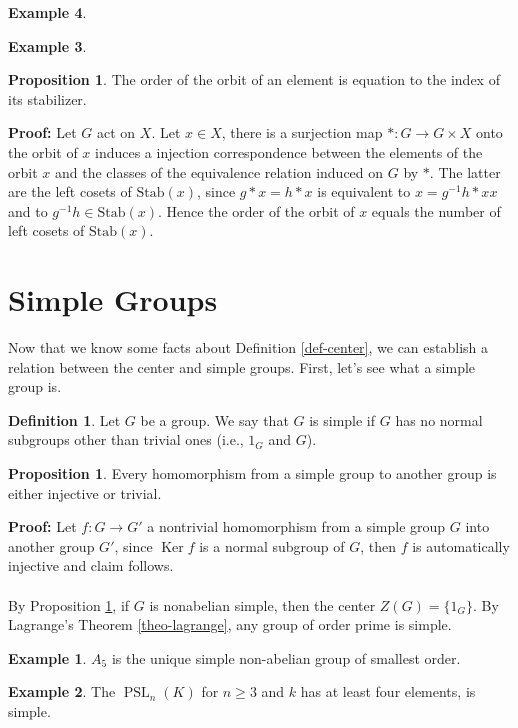 \documentclass[11pt]{amsbook}%
\theoremstyle{plain}
\theoremstyle{definition}
\newtheorem{definition*}{Definition}
\newtheorem*{example*}{Example}
\newtheorem{proposition}[theorem]{Proposition}
\numberwithin{equation}{section}
\renewcommand{\proof}{ \textbf{Proof: }}
\newcommand{\Stab}[1]{\text{Stab}(#1)}
\DeclareMathOperator{\PSL}{PSL}
\DeclareMathOperator{\Ker}{Ker}
\begin{document}
\begin{example*}
\begin{example*}
\begin{proposition}
  The order of the orbit of an element is equation to the index of its
  stabilizer.
\end{proposition} \vspace{1.8em}
\proof Let $G$ act on $X$. Let $x \in X$, there is a surjection map
$*:G \longrightarrow G \times X$ onto the orbit of $x$ induces a injection
correspondence between the elements of the orbit $x$ and the classes
of the equivalence relation induced on $G$ by $*$. The latter
are the left cosets of $\Stab{x}$, since $g*x = h*x$ is equivalent
to $x = g^{-1}h*xx$ and to $g^{-1}h \in \Stab{x}$. Hence the order of the
orbit of $x$ equals the number of left cosets of $\Stab{x}$. \qedsymbol

\section{Simple Groups}
Now that we know some facts about Definition \ref{def-center}, we can establish a relation
between the center and simple groups. First, let's see what a simple group is.
\begin{definition*}
  Let $G$ be a group. We say that $G$ is simple if $G$ has no normal subgroups other than trivial ones (i.e., $1_{G}$ and $G$).
\end{definition*}

\begin{proposition}
  \label{prop-simple}
  Every homomorphism from a simple group to another group is either injective or trivial.
\end{proposition} \vspace{1.8em}
\proof Let $f: G \longrightarrow G'$ a nontrivial homomorphism from a simple group $G$ into another group $G'$,
since $\Ker f$ is a normal subgroup of $G$, then $f$ is automatically injective and claim follows. \qedsymbol \\ \\
By Proposition \ref{prop-simple}, if $G$ is nonabelian simple, then the center $Z(G) = \{1_{G}\}$. By Lagrange's Theorem
\ref{theo-lagrange}, any group of order prime is simple.

\begin{example*}
  $A_{5}$ is the unique simple non-abelian group of smallest order.
\end{example*}

\begin{example*}
  The $\PSL_{n}(K)$ for $n \geq 3$ and $k$ has at least
  four elements, is simple.
\end{example*} 


\end{example*}
\end{example*}
\end{document}

